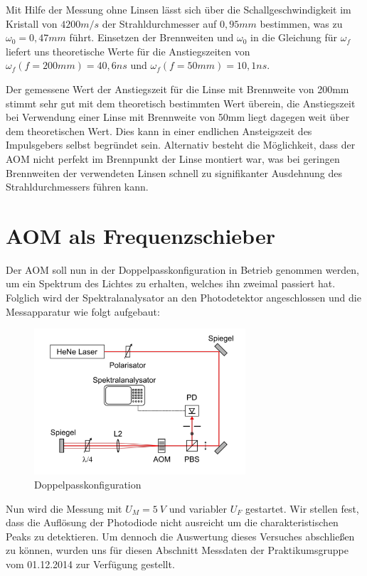 \documentclass[bigchapter,colorback,accentcolor=tud4b,linedtoc,11pt]{tudreport}
\begin{document}
Mit Hilfe der Messung ohne Linsen lässt sich über die Schallgeschwindigkeit im Kristall von $4200 m/s$ der Strahldurchmesser auf $0,95mm$ bestimmen, was zu $\omega_0 = 0,47mm$ führt.
Einsetzen der Brennweiten und $\omega_0$ in die Gleichung für $\omega_f$ liefert uns theoretische Werte für die Anstiegszeiten von $\omega_f(f=200mm)=40,6ns$ und $\omega_f(f=50mm)=10,1ns$.

Der gemessene Wert der Anstiegszeit für die Linse mit Brennweite von 200mm stimmt sehr gut mit dem theoretisch bestimmten Wert überein, die Anstiegszeit bei Verwendung einer Linse mit Brennweite von 50mm liegt dagegen weit über dem theoretischen Wert. Dies kann in einer endlichen Ansteigszeit des Impulsgebers selbst begründet sein. Alternativ besteht die Möglichkeit, dass der AOM nicht perfekt im Brennpunkt der Linse montiert war, was bei geringen Brennweiten der verwendeten Linsen schnell zu signifikanter Ausdehnung des Strahldurchmessers führen kann.

\section{AOM als Frequenzschieber}

Der AOM soll nun in der Doppelpasskonfiguration in Betrieb genommen werden, um ein Spektrum des Lichtes zu erhalten, welches ihn zweimal passiert hat. Folglich wird der Spektralanalysator an den Photodetektor angeschlossen und die Messapparatur wie folgt aufgebaut: 

\begin{figure}[H] 
  \centering
     \includegraphics[width=0.7\textwidth]{img/doppelpass.jpg}
  \caption[Cap for listoffigures]{Doppelpasskonfiguration \cite{Anleitung}}
  \label{fig:Bild3}
\end{figure}

Nun wird die Messung mit $U_M = 5~V$ und variabler $U_F$ gestartet. Wir stellen fest, dass die Auflösung der Photodiode nicht ausreicht um die charakteristischen Peaks zu detektieren. Um dennoch die Auswertung dieses Versuches abschließen zu können, wurden uns für diesen Abschnitt Messdaten der Praktikumsgruppe vom 01.12.2014 zur Verfügung gestellt.
\end{document}
